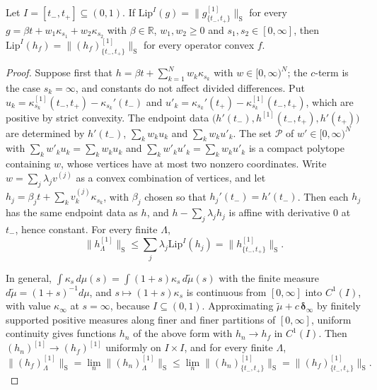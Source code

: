\begin{proposition}\label{cont:prop:two poles}
Let $I=[t_-,t_+]\subseteq(0,1)$. If $\mathrm{Lip}^I(g)=\|g^{[1]}_{\{t_-,t_+\}}\|_{\mathrm S}$ for every $g=\beta t+w_1\kappa_{s_1}+w_2\kappa_{s_2}$ with $\beta\in\mathbb{R}$, $w_1,w_2\geq0$ and $s_1,s_2\in[0,\infty]$, then $\mathrm{Lip}^I(h_f)=\|(h_f)^{[1]}_{\{t_-,t_+\}}\|_{\mathrm S}$ for every operator convex $f$.
\end{proposition}
 
\begin{proof}
Suppose first that $h=\beta t+\sum_{k=1}^Nw_k\kappa_{s_k}$ with $w\in[0,\infty)^N$; the $c$-term is the case $s_k=\infty$, and constants do not affect divided differences. Put $u_k=\kappa_{s_k}^{[1]}(t_-,t_+)-\kappa_{s_k}'(t_-)$ and $u'_k=\kappa_{s_k}'(t_+)-\kappa_{s_k}^{[1]}(t_-,t_+)$, which are positive by strict convexity. The endpoint data $\big(h'(t_-),h^{[1]}(t_-,t_+),h'(t_+)\big)$ are determined by $h'(t_-)$, $\sum_kw_ku_k$ and $\sum_kw_ku'_k$. The set $\mathcal{P}$ of $w'\in[0,\infty)^N$ with $\sum_kw'_ku_k=\sum_kw_ku_k$ and $\sum_kw'_ku'_k=\sum_kw_ku'_k$ is a compact polytope containing $w$, whose vertices have at most two nonzero coordinates. Write $w=\sum_j\lambda_jv^{(j)}$ as a convex combination of vertices, and let $h_j=\beta_jt+\sum_kv^{(j)}_k\kappa_{s_k}$, with $\beta_j$ chosen so that $h_j'(t_-)=h'(t_-)$. Then each $h_j$ has the same endpoint data as $h$, and $h-\sum_j\lambda_jh_j$ is affine with derivative $0$ at $t_-$, hence constant. For every finite $\Lambda$,
\[
\|h^{[1]}_\Lambda\|_{\mathrm S}\leq\sum_j\lambda_j\mathrm{Lip}^I(h_j)=\|h^{[1]}_{\{t_-,t_+\}}\|_{\mathrm S}.
\]
 
In general, $\int\kappa_s\,d\mu(s)=\int(1+s)\kappa_s\,d\tilde\mu(s)$ with the finite measure $d\tilde\mu=(1+s)^{-1}d\mu$, and $s\mapsto(1+s)\kappa_s$ is continuous from $[0,\infty]$ into $C^1(I)$, with value $\kappa_\infty$ at $s=\infty$, because $I\subseteq(0,1)$. Approximating $\tilde\mu+c\,\boldsymbol{\delta}_\infty$ by finitely supported positive measures along finer and finer partitions of $[0,\infty]$, uniform continuity gives functions $h_n$ of the above form with $h_n\to h_f$ in $C^1(I)$. Then $(h_n)^{[1]}\to(h_f)^{[1]}$ uniformly on $I\times I$, and for every finite $\Lambda$,
\[
\|(h_f)^{[1]}_\Lambda\|_{\mathrm S}=\lim_n\|(h_n)^{[1]}_\Lambda\|_{\mathrm S}\leq\lim_n\|(h_n)^{[1]}_{\{t_-,t_+\}}\|_{\mathrm S}=\|(h_f)^{[1]}_{\{t_-,t_+\}}\|_{\mathrm S}.
\]
\end{proof}
 

